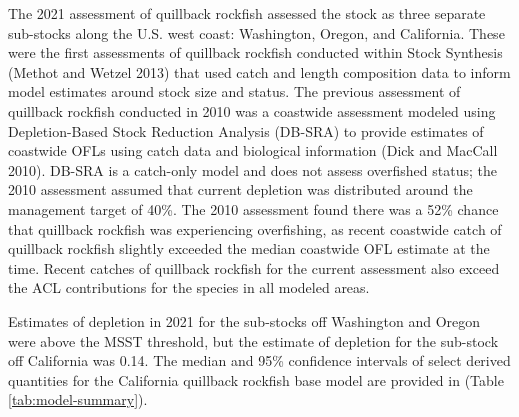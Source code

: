 \documentclass[11pt,
  english,
  a4paper,
]{article}
\begin{document}
The 2021 assessment of quillback rockfish assessed the stock as three separate sub-stocks along the U.S. west coast: Washington, Oregon, and California. These were the first assessments of quillback rockfish conducted within Stock Synthesis {(Methot and Wetzel 2013)\leavevmode\tagmcend\tagstructend} that used catch and length composition data to inform model estimates around stock size and status. The previous assessment of quillback rockfish conducted in 2010 was a coastwide assessment modeled using Depletion-Based Stock Reduction Analysis (DB-SRA) to provide estimates of coastwide OFLs using catch data and biological information {(Dick and MacCall 2010)\leavevmode\tagmcend\tagstructend}. DB-SRA is a catch-only model and does not assess overfished status; the 2010 assessment assumed that current depletion was distributed around the management target of 40\%. The 2010 assessment found there was a 52\% chance that quillback rockfish was experiencing overfishing, as recent coastwide catch of quillback rockfish slightly exceeded the median coastwide OFL estimate at the time. Recent catches of quillback rockfish for the current assessment also exceed the ACL contributions for the species in all modeled areas.

\leavevmode\tagmcend\tagstructend\par


Estimates of depletion in 2021 for the sub-stocks off Washington and Oregon were above the MSST threshold, but the estimate of depletion for the sub-stock off California was 0.14. The median and 95\% confidence intervals of select derived quantities for the California quillback rockfish base model are provided in (Table \ref{tab:model-summary}).

\leavevmode\tagmcend\tagstructend\par

\end{document}
